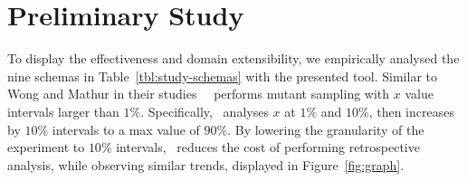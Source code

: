 \section{Preliminary Study}


To display the effectiveness and domain extensibility, we empirically analysed the nine schemas in
Table~\ref{tbl:study-schemas} with the presented tool. Similar to Wong and Mathur in their
studies~\cite{mathur1994empirical} \mr~performs mutant sampling with $x$ value intervals larger than $1\%$.
Specifically, \mr~analyses $x$ at $1\%$ and $10\%$, then increases by $10\%$ intervals to a max value of $90\%$.  By
lowering the granularity of the experiment to $10\%$ intervals, \mr~reduces the cost of performing retrospective
analysis, while observing similar trends, displayed in Figure~\ref{fig:graph}.








